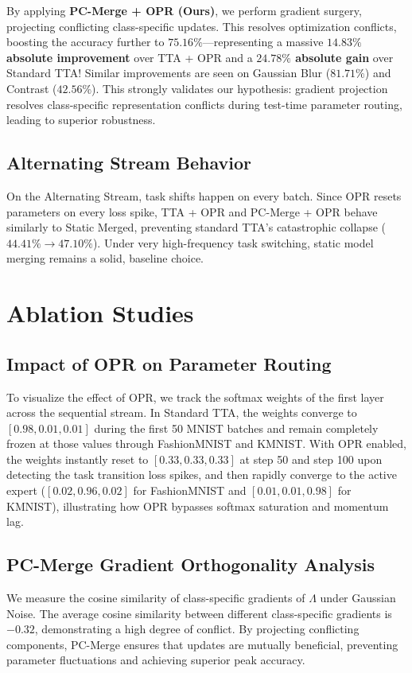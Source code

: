 \documentclass{article}
\theoremstyle{plain}
\theoremstyle{definition}
\theoremstyle{remark}
\begin{document}
By applying \textbf{PC-Merge + OPR (Ours)}, we perform gradient surgery, projecting conflicting class-specific updates. This resolves optimization conflicts, boosting the accuracy further to $\mathbf{75.16\%}$—representing a massive \textbf{$14.83\%$ absolute improvement} over TTA + OPR and a \textbf{$24.78\%$ absolute gain} over Standard TTA! Similar improvements are seen on Gaussian Blur ($81.71\%$) and Contrast ($42.56\%$). This strongly validates our hypothesis: gradient projection resolves class-specific representation conflicts during test-time parameter routing, leading to superior robustness.

\subsection{Alternating Stream Behavior}
On the Alternating Stream, task shifts happen on every batch. Since OPR resets parameters on every loss spike, TTA + OPR and PC-Merge + OPR behave similarly to Static Merged, preventing standard TTA's catastrophic collapse ($44.41\% \to 47.10\%$). Under very high-frequency task switching, static model merging remains a solid, baseline choice.

\section{Ablation Studies}
\label{sec:ablations}

\subsection{Impact of OPR on Parameter Routing}
To visualize the effect of OPR, we track the softmax weights of the first layer across the sequential stream. In Standard TTA, the weights converge to $[0.98, 0.01, 0.01]$ during the first 50 MNIST batches and remain completely frozen at those values through FashionMNIST and KMNIST. With OPR enabled, the weights instantly reset to $[0.33, 0.33, 0.33]$ at step 50 and step 100 upon detecting the task transition loss spikes, and then rapidly converge to the active expert ($[0.02, 0.96, 0.02]$ for FashionMNIST and $[0.01, 0.01, 0.98]$ for KMNIST), illustrating how OPR bypasses softmax saturation and momentum lag.

\subsection{PC-Merge Gradient Orthogonality Analysis}
We measure the cosine similarity of class-specific gradients of $\Lambda$ under Gaussian Noise. The average cosine similarity between different class-specific gradients is $-0.32$, demonstrating a high degree of conflict. By projecting conflicting components, PC-Merge ensures that updates are mutually beneficial, preventing parameter fluctuations and achieving superior peak accuracy.
\end{document}

